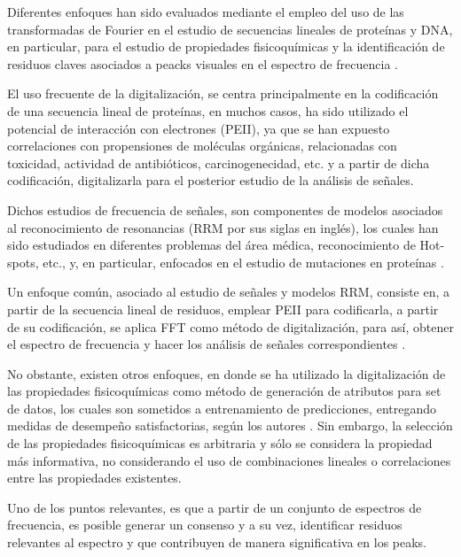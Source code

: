 Diferentes enfoques han sido evaluados mediante el empleo del uso de las transformadas de Fourier en el estudio de secuencias lineales de proteínas y DNA, en particular, para el estudio de propiedades fisicoquímicas y la identificación de residuos claves asociados a peacks visuales en el espectro de frecuencia \cite{veljkovic1985possible, cosic1987prediction}. 

El uso frecuente de la digitalización, se centra principalmente en la codificación de una secuencia lineal de proteínas, en muchos casos, ha sido utilizado el potencial de interacción con electrones (PEII), ya que se han expuesto correlaciones con propensiones de moléculas orgánicas, relacionadas con toxicidad, actividad de antibióticos, carcinogenecidad, etc. \cite{veljkovic1985possible, cosic1994macromolecular, cosic1987prediction} y a partir de dicha codificación, digitalizarla para el posterior estudio de la análisis de señales.

Dichos estudios de frecuencia de señales, son componentes de modelos asociados al reconocimiento de resonancias (RRM por sus siglas en inglés), los cuales han sido estudiados en diferentes problemas del área médica, reconocimiento de Hot-spots, etc., y, en particular, enfocados en el estudio de mutaciones en proteínas \cite{cosic1994macromolecular, cosic2016analysis, cosic1987prediction}. 

Un enfoque común, asociado al estudio de señales y modelos RRM, consiste en, a partir de la secuencia lineal de residuos, emplear PEII para codificarla, a partir de su codificación, se aplica FFT como método de digitalización, para así, obtener el espectro de frecuencia y hacer los análisis de señales correspondientes \cite{veljkovic1985possible, cosic1994macromolecular, cosic2016analysis, cosic1987prediction}.

No obstante, existen otros enfoques, en donde se ha utilizado la digitalización de las propiedades fisicoquímicas como método de generación de atributos para set de datos, los cuales son sometidos a entrenamiento de predicciones, entregando medidas de desempeño satisfactorias, según los autores \cite{cadet2018application}. Sin embargo, la selección de las propiedades fisicoquímicas es arbitraria y sólo se considera la propiedad más informativa, no considerando el uso de combinaciones lineales o correlaciones entre las propiedades existentes.

Uno de los puntos relevantes, es que a partir de un conjunto de espectros de frecuencia, es posible generar un consenso y a su vez, identificar residuos relevantes al espectro y que contribuyen de manera significativa en los peaks.

